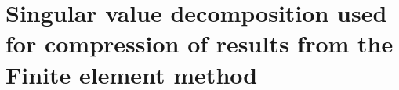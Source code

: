 \chapter{Singular value decomposition used for compression of results from the Finite element method}
\label{AppendixC}
